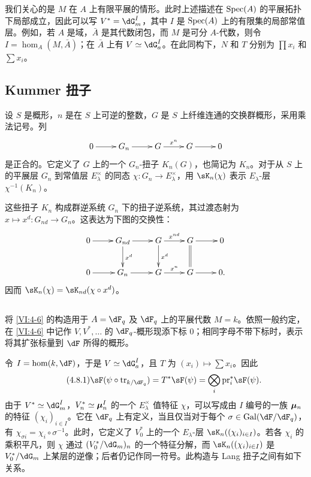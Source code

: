 我们关心的是 $M$ 在 $A$ 上有限平展的情形。此时上述描述在 $\operatorname{Spec}(A)$ 的平展拓扑下局部成立，因此可以写 $V^\ast=\dG_m^I$，其中 $I$ 是 $\operatorname{Spec}(A)$ 上的有限集的局部常值层。例如，若 $A$ 是域，$\bar A$ 是其代数闭包，而 $M$ 是可分 $A$-代数，则令 $I=\hom_A(M,\bar A)$；在 $\bar A$ 上有 $V\simeq\dG_a^I$。在此同构下，$N$ 和 $T$ 分别为 $\prod x_i$ 和 $\sum x_i$。

\subsection{Kummer 扭子}\label{VI:4-7}
设 $S$ 是概形，$n$ 是在 $S$ 上可逆的整数，$G$ 是 $S$ 上纤维连通的交换群概形，采用乘法记号。列
\[\xymatrix{0\ar[r]&G_n\ar[r]&G\ar[r]^-{x^n}&G\ar[r]&0}\]
是正合的。它定义了 $G$ 上的一个 $G_n$-扭子 $K_n(G)$，也简记为 $K_n$。对于从 $S$ 上的平展层 $G_n$ 到常值层 $E_\lambda^\times$ 的同态 $\chi:G_n\to E_\lambda^\times$，用 $\sK_n(\chi)$ 表示 $E_\lambda$-层 $\chi^{-1}(K_n)$。

这些扭子 $K_n$ 构成群逆系统 $G_n$ 下的扭子逆系统，其过渡态射为 $x\mapsto x^d:G_{nd}\to G_n$。这表达为下图的交换性：
\[\xymatrix{
0\ar[r]&G_{nd}\ar[r]\ar[d]^-{x^d}&G\ar[r]^-{x^{nd}}\ar[d]^-{x^d}&G\ar[r]\ar@{=}[d]&0\\
0\ar[r]&G_n\ar[r]&G\ar[r]^-{x^n}&G\ar[r]&0.
}\]
因而 $\sK_n(\chi)=\sK_{nd}(\chi\circ x^d)$。

\subsection{}\label{VI:4-8}
将 \ref{VI:4-6} 的构造用于 $A=\dF_q$ 及 $\dF_q$ 上的平展代数 $M=k$。依照一般约定，在 \ref{VI:4-6} 中记作 $V,V^\ast,\ldots$ 的 $\dF_q$-概形现添下标 $0$；相同字母不带下标时，表示将其扩张标量到 $\dF$ 所得的概形。

令 $I=\hom(k,\dF)$，于是 $V\simeq\dG_a^I$，且 $T$ 为 $(x_i)\mapsto\sum x_i$。因此
\begin{equation*}\tag{4.8.1}\label{VI:eq:4-8-1}
\sF(\psi\circ\tr_{k/\dF_q})=T^\ast\sF(\psi)=\bigotimes_i\pr_i^\ast\sF(\psi).
\end{equation*}
由于 $V^\ast\simeq\dG_m^I$，$V_n^\ast\simeq{\bm\mu}_n^I$ 的一个 $E_\lambda^\times$ 值特征 $\chi$，可以写成由 $I$ 编号的一族 ${\bm\mu}_n$ 的特征 $(\chi_i)_{i\in I}$。它在 $\dF_q$ 上有定义，当且仅当对于每个 $\sigma\in\gal(\dF/\dF_q)$，有 $\chi_{\sigma i}=\chi_i\circ\sigma^{-1}$。此时，它定义了 $V_0^\ast$ 上的一个 $E_\lambda$-层 $\sK_n((\chi_i)_{i\in I})$。若各 $\chi_i$ 的乘积平凡，则 $\chi$ 通过 $(V_0^\ast/\dG_m)_n$ 的一个特征分解，而 $\sK_n((\chi_i)_{i\in I})$ 是 $V_0^\ast/\dG_m$ 上某层的逆像；后者仍记作同一符号。此构造与 Lang 扭子之间有如下关系。


